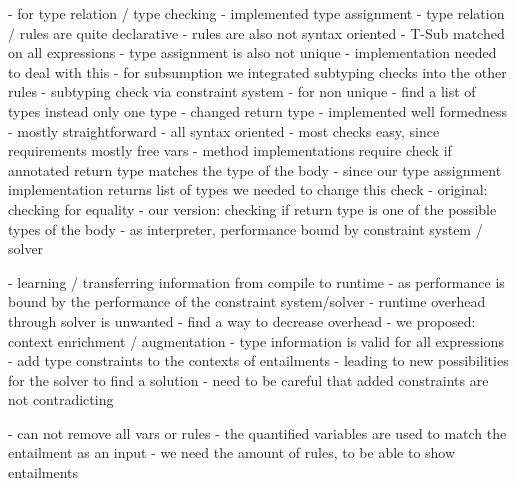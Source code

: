 - for type relation / type checking
  - implemented type assignment
    - type relation / rules are quite declarative
    - rules are also not syntax oriented
      - T-Sub matched on all expressions
    - type assignment is also not unique
  - implementation needed to deal with this
    - for subsumption we integrated subtyping checks into the other rules
      - subtyping check via constraint system
    - for non unique
      - find a list of types instead only one type
      - changed return type
  - implemented well formedness
    - mostly straightforward
    - all syntax oriented
    - most checks easy, since requirements mostly free vars
    - method implementations require check if annotated return type matches the type of the body
      - since our type assignment implementation returns list of types
        we needed to change this check
      - original: checking for equality
      - our version: checking if return type is one of the possible types of the body
  - as interpreter, performance bound by constraint system / solver
  
- learning / transferring information from compile to runtime
  - as performance is bound by the performance of the constraint system/solver
  - runtime overhead through solver is unwanted
  - find a way to decrease overhead
  - we proposed: context enrichment / augmentation
  - type information is valid for all expressions
  - add type constraints to the contexts of entailments
  - leading to new possibilities for the solver to find a solution
  - need to be careful that added constraints are not contradicting

- can not remove all vars or rules
- the quantified variables are used to match the entailment as an input
- we need the amount of rules, to be able to show entailments


